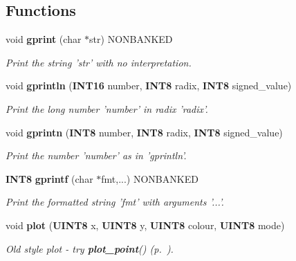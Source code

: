 \subsection*{Functions}
\begin{CompactItemize}
\item 
\label{drawing.h_a14}
void {\bf gprint} (char $\ast$str) NONBANKED
\begin{CompactList}\small\item\em Print the string 'str' with no interpretation.\item\end{CompactList}

\item 
void {\bf gprintln} ({\bf INT16} number, {\bf INT8} radix, {\bf INT8} signed\_\-value)
\begin{CompactList}\small\item\em Print the long number 'number' in radix 'radix'.\item\end{CompactList}

\item 
\label{drawing.h_a16}
void {\bf gprintn} ({\bf INT8} number, {\bf INT8} radix, {\bf INT8} signed\_\-value)
\begin{CompactList}\small\item\em Print the number 'number' as in 'gprintln'.\item\end{CompactList}

\item 
\label{drawing.h_a17}
{\bf INT8} {\bf gprintf} (char $\ast$fmt,...) NONBANKED
\begin{CompactList}\small\item\em Print the formatted string 'fmt' with arguments '...'.\item\end{CompactList}

\item 
\label{drawing.h_a18}
void {\bf plot} ({\bf UINT8} x, {\bf UINT8} y, {\bf UINT8} colour, {\bf UINT8} mode)
\begin{CompactList}\small\item\em Old style plot - try {\bf plot\_\-point}() {\rm (p.~\pageref{drawing.h_a19})}.\item\end{CompactList}


\end{CompactItemize}
